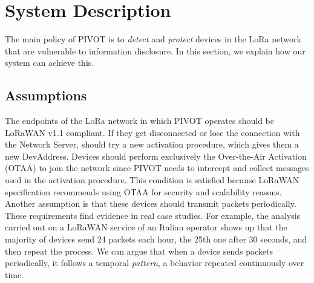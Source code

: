 \newpage

\section{System Description}
\label{system}
The main policy of PIVOT is to \textit{detect} and \textit{protect} devices in the LoRa network that are vulnerable to information disclosure. In this section, we explain how our system can achieve this.
\vspace{5mm}

\subsection{Assumptions}
The endpoints of the LoRa network in which PIVOT operates should be LoRaWAN v1.1 compliant. If they get disconnected or lose the connection with the Network Server, should try a new activation procedure, which gives them a new DevAddress. Devices should perform exclusively the Over-the-Air Activation (OTAA) to join the network since PIVOT needs to intercept and collect \jr messages used in the activation procedure. This condition is satisfied because LoRaWAN specification recommends using OTAA for security and scalability reasons. 
\\
Another assumption is that these devices should transmit packets periodically. These requirements find evidence in real case studies. For example, the analysis carried out on a LoRaWAN service of an Italian operator \cite{devil} shows up that the majority of devices send 24 packets each hour, the 25th one after 30 seconds, and then repeat the process. We can argue that when a device sends packets periodically, it follows a temporal \textit{pattern}, a behavior repeated continuously over time.
\vspace{5mm}

